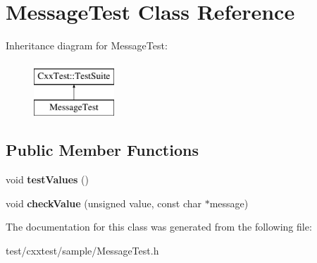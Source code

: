 \hypertarget{classMessageTest}{\section{Message\-Test Class Reference}
\label{classMessageTest}
}
Inheritance diagram for Message\-Test\-:\begin{figure}[H]
\begin{center}
\leavevmode
\includegraphics[height=2.000000cm]{classMessageTest}
\end{center}
\end{figure}
\subsection*{Public Member Functions}
\begin{DoxyCompactItemize}
\item 
\hypertarget{classMessageTest_a88a87f93c3d8e51d8f9c66c910546fdc}{void {\bfseries test\-Values} ()}\label{classMessageTest_a88a87f93c3d8e51d8f9c66c910546fdc}

\item 
\hypertarget{classMessageTest_a8720e8f16fd3796f74d2bb55dfa21ac7}{void {\bfseries check\-Value} (unsigned value, const char $\ast$message)}\label{classMessageTest_a8720e8f16fd3796f74d2bb55dfa21ac7}

\end{DoxyCompactItemize}


The documentation for this class was generated from the following file\-:\begin{DoxyCompactItemize}
\item 
test/cxxtest/sample/Message\-Test.\-h\end{DoxyCompactItemize}
